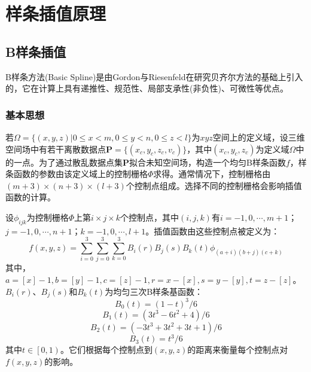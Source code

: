 \section{样条插值原理}

\subsection{B样条插值}
B样条方法(Basic Spline)是由Gordon与Riesenfeld在研究贝齐尔方法的基础上引入的，它在计算上具有递推性、规范性、局部支承性(非负性)、可微性等优点。

\subsubsection{基本思想}
若$ \Omega = \{ \left( x,y,z \right) | 0 \leq x <  m, 0 \leq y < n, 0 \leq z < l \}  $为$ xyz $空间上的定义域，设三维空间场中有若干离散数据点$ \mathbf{P} = \{ \left( x_{c},y_{c},z_{c},v_{c} \right) \} $，其中$ \left( x_{c},y_{c},z_{c} \right) $为定义域$ \Omega $中的一点。为了通过散乱数据点集$ \mathbf{P} $拟合未知空间场，构造一个均匀B样条函数$ f $，样条函数的参数由该定义域上的控制栅格$ \Phi $求得。通常情况下，控制栅格由$ \left( m+3 \right) \times \left( n+3 \right) \times \left( l+3 \right) $个控制点组成。选择不同的控制栅格会影响插值函数的计算。

设$ \phi_{ijk} $为控制栅格$ \Phi $上第$ i \times j \times k $个控制点，其中$ \left( i,j,k \right) $有$ i=-1,0,\cdots,m+1 $；$ j=-1,0,\cdots,n+1 $；$ k=-1,0,\cdots,l+1 $。插值函数由这些控制点被定义为：
\begin{equation}
    f(x,y,z)=\sum_{i=0}^{3}\sum_{j=0}^{3}\sum_{k=0}^{3}B_{i}(r)B_{j}(s)B_{k}(t) \phi_{(a+i)(b+j)(c+k)}
    \label{三次B样条插值函数}
\end{equation}
其中，$ a=[x]-1,b=[y]-1,c=[z]-1,r=x-[x],s=y-[y],t=z-[z]$。$ B_{i}(r)\text{、}B_{j}(s)\text{和}B_{k}(t) $为均匀三次B样条基函数：
\begin{equation*}
    B_{0} \left( t \right) = \left( 1 - t \right)^{3} / 6
\end{equation*}
\begin{equation*}
    B_{1} \left( t \right) = \left( 3 t^{3} - 6 t^{2} + 4 \right) / 6
\end{equation*}
\begin{equation*}
    B_{2} \left( t \right) = \left( -3 t^{3} + 3 t^{2}  + 3 t + 1 \right) / 6
\end{equation*}
\begin{equation*}
    B_{3} \left( t \right) = t^{3} / 6
\end{equation*}
其中$ t \in \left[ 0, 1 \right) $。它们根据每个控制点到$ \left( x,y,z \right) $的距离来衡量每个控制点对$ f\left( x,y,z \right) $的影响。

